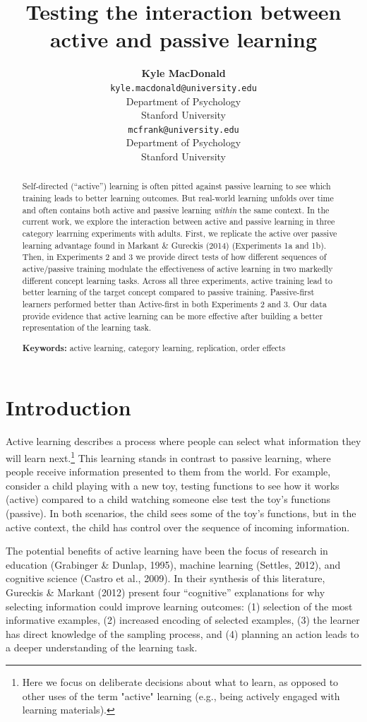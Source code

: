 \documentclass[10pt, letterpaper]{article}
\title{Testing the interaction between active and passive learning}
\author{{\large \bf Kyle MacDonald} \\ \texttt{kyle.macdonald@university.edu} \\ Department of Psychology \\ Stanford University \And {\large \bf Michael C. Frank} \\ \texttt{mcfrank@university.edu} \\ Department of Psychology \\ Stanford University}
\begin{document}
\maketitle

\begin{abstract}
Self-directed (``active'') learning is often pitted against passive
learning to see which training leads to better learning outcomes. But
real-world learning unfolds over time and often contains both active and
passive learning \emph{within} the same context. In the current work, we
explore the interaction between active and passive learning in three
category learrning experiments with adults. First, we replicate the
active over passive learning advantage found in Markant \& Gureckis
(2014) (Experiments 1a and 1b). Then, in Experiments 2 and 3 we provide
direct tests of how different sequences of active/passive training
modulate the effectiveness of active learning in two markedly different
concept learning tasks. Across all three experiments, active training
lead to better learning of the target concept compared to passive
training. Passive-first learners performed better than Active-first in
both Experiments 2 and 3. Our data provide evidence that active learning
can be more effective after building a better representation of the
learning task.

\textbf{Keywords:}
active learning, category learning, replication, order effects
\end{abstract}

\section{Introduction}\label{introduction}

Active learning describes a process where people can select what
information they will learn
next.\footnote{Here we focus on deliberate decisions about what to learn, as opposed to other uses of the term "active" learning (e.g., being actively engaged with learning materials).}
This learning stands in contrast to passive learning, where people
receive information presented to them from the world. For example,
consider a child playing with a new toy, testing functions to see how it
works (active) compared to a child watching someone else test the toy's
functions (passive). In both scenarios, the child sees some of the toy's
functions, but in the active context, the child has control over the
sequence of incoming information.

The potential benefits of active learning have been the focus of
research in education (Grabinger \& Dunlap, 1995), machine learning
(Settles, 2012), and cognitive science (Castro et al., 2009). In their
synthesis of this literature, Gureckis \& Markant (2012) present four
``cognitive'' explanations for why selecting information could improve
learning outcomes: (1) selection of the most informative examples, (2)
increased encoding of selected examples, (3) the learner has direct
knowledge of the sampling process, and (4) planning an action leads to a
deeper understanding of the learning task.
\end{document}
